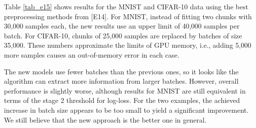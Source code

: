 %
Table \ref{tab_e15} shows results for the MNIST and CIFAR-10 data using the best preprocessing methods from [E14].
For MNIST, instead of fitting two chunks with 30,000 samples each, the new results use an upper limit of 40,000 samples per batch.
For CIFAR-10, chunks of 25,000 samples are replaced by batches of size 35,000.
These numbers approximate the limits of GPU memory, i.e., adding 5,000 more samples causes an out-of-memory error in each case.\par
%
The new models use fewer batches than the previous ones, so it looks like the algorithm can extract more information from larger batches.
However, overall performance is slightly worse, although results for MNIST are still equivalent in terms of the stage 2 threshold for log-loss.
For the two examples, the achieved increase in batch size appears to be too small to yield a significant improvement.
We still believe that the new approach is the better one in general.
%
